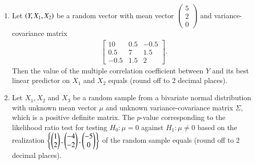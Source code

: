 \documentclass[journal]{IEEEtran}
\begin{document}
\begin{enumerate}
\item Let $\left(Y, X_1, X_2\right)$ be a random vector with mean vector $\begin{pmatrix} 5 \\ 2 \\ 0 \end{pmatrix}$ and variance-covariance matrix
\begin{align*}
\begin{bmatrix}
10 & 0.5 & -0.5 \\
0.5 & 7 & 1.5 \\
-0.5 & 1.5 & 2
\end{bmatrix}.
\end{align*}
Then the value of the multiple correlation coefficient between $Y$ and its best linear predictor on $X_1$ and $X_2$ equals \underline{\hspace{1cm}} (round off to 2 decimal places).

\item Let $X_1, X_2$ and $X_3$ be a random sample from a bivariate normal distribution with unknown mean vector $\mu$ and unknown variance-covariance matrix $\Sigma$, which is a positive definite matrix. The $p$-value corresponding to the likelihood ratio test for testing $H_0: \mu = 0$ against $H_1: \mu \neq 0$ based on the realization $\left\{ \begin{pmatrix} 1 \\ 2 \end{pmatrix}, \begin{pmatrix} -4 \\ -2 \end{pmatrix}, \begin{pmatrix} -5 \\ 0 \end{pmatrix}\right\}$  of the random sample equals \underline{\hspace{1cm}} (round off to 2 decimal places).


\end{enumerate}
\end{document}
